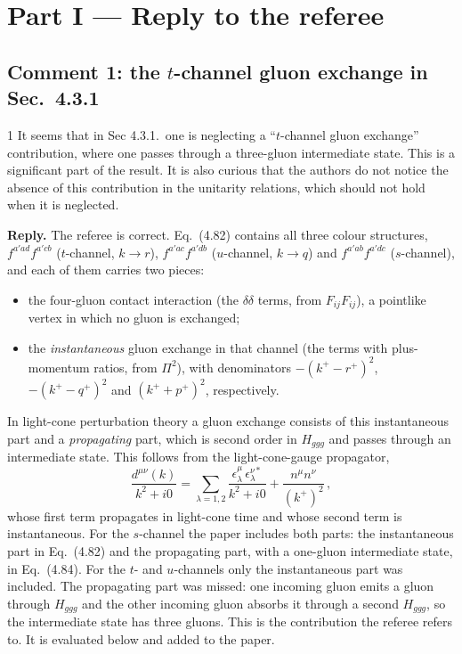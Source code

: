 \documentclass[11pt,a4paper]{article}
\newcommand{\Hggg}{H_{ggg}}
\begin{document}
\section*{Part I --- Reply to the referee}

\subsection*{Comment 1: the $t$-channel gluon exchange in Sec.~4.3.1}

\begin{referee}{1}
It seems that in Sec 4.3.1.\ one is neglecting a ``$t$-channel gluon exchange'' contribution, where one passes through a three-gluon intermediate state. This is a significant part of the result. It is also curious that the authors do not notice the absence of this contribution in the unitarity relations, which should not hold when it is neglected.
\end{referee}

\textbf{Reply.} The referee is correct. Eq.~(4.82) contains all three colour structures, $f^{a'ad}f^{a'cb}$ ($t$-channel, $k\to r$), $f^{a'ac}f^{a'db}$ ($u$-channel, $k\to q$) and $f^{a'ab}f^{a'dc}$ ($s$-channel), and each of them carries two pieces:
\begin{itemize}[leftmargin=18pt,itemsep=1pt]
\item the four-gluon contact interaction (the $\delta\delta$ terms, from $F_{ij}F_{ij}$), a pointlike vertex in which no gluon is exchanged;
\item the \emph{instantaneous} gluon exchange in that channel (the terms with plus-momentum ratios, from $\Pi^2$), with denominators $-(k^+-r^+)^2$, $-(k^+-q^+)^2$ and $(k^++p^+)^2$, respectively.
\end{itemize}
In light-cone perturbation theory a gluon exchange consists of this instantaneous part and a \emph{propagating} part, which is second order in $\Hggg$ and passes through an intermediate state. This follows from the light-cone-gauge propagator,
\[
\frac{d^{\mu\nu}(k)}{k^2+i0}=\sum_{\lambda=1,2}\frac{\epsilon^\mu_\lambda\,\epsilon^{\nu*}_\lambda}{k^2+i0}+\frac{n^\mu n^\nu}{(k^+)^2}\,,
\]
whose first term propagates in light-cone time and whose second term is instantaneous. For the $s$-channel the paper includes both parts: the instantaneous part in Eq.~(4.82) and the propagating part, with a one-gluon intermediate state, in Eq.~(4.84). For the $t$- and $u$-channels only the instantaneous part was included. The propagating part was missed: one incoming gluon emits a gluon through $\Hggg$ and the other incoming gluon absorbs it through a second $\Hggg$, so the intermediate state has three gluons. This is the contribution the referee refers to. It is evaluated below and added to the paper.
\end{document}
